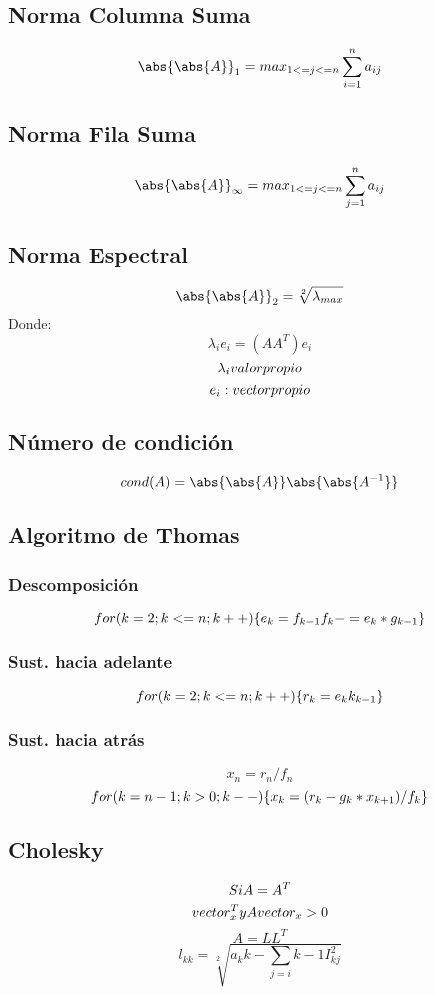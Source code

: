    \subsection{Norma Columna Suma}
   $$
   \abs{ \abs { A } }_1 = max_{1 <= j <= n} \sum_{i=1} ^{n} a_{ij}
   $$
   
   \subsection{Norma Fila Suma}
   $$
   	  \abs{ \abs { A } }_{\infty} = max_{1 <= j <= n} \sum_{j=1} ^{n} a_{ij}
   $$
   
   \subsection{Norma Espectral}
   $$
    \abs{ \abs { A } }_2 = \sqrt[2]{\lambda_{max}}
   $$
   Donde:
   $$
   \lambda_{i} e_{i} = ( AA^T) e_{i}
   $$
   $$
   \lambda_{i} \space valor \space propio
   $$
   $$
    e_{i} : \space vector  \space propio
   $$
   
   \subsection{Número de condición}
   $$
   	cond(A) = \abs{  \abs{ A}}\abs{  \abs{ A^{-1}}}
   $$
   
   \subsection{Algoritmo de Thomas}
   \subsubsection{Descomposición}
   	$$
    	for \space  ( k=2; k<= n ; k++)
        \{
        e_{k} \/= f _{k-1}
        f_k -= e_k * g_{k-1}
        \}
    $$
   \subsubsection{Sust. hacia adelante}
   	$$
    	for \space  ( k=2; k<= n ; k++)
        \{
        r_{k} \-= e_{k} k_{k-1}
        \}
    $$
   \subsubsection{Sust. hacia atrás}
   $$
   	x_n = r_n / f_n   
   $$
   $$
    	for \space  ( k=n-1; k >0  ; k--)
        \{
        x_k = (r_k - g_k* x_{k+1})/f_k
        \}
   $$
   \subsection{Cholesky}
   $$
   	Si \space A = A^{T}
   $$
   $$
   	vector_x^T \space y \space A vector_x > 0
   $$
   $$
   	A = LL^T
   $$
   $$
   l_{kk} = \sqrt[2]{a_kk - \sum_{j=i}{ k-1} I^2_{kj} }
   $$
   
